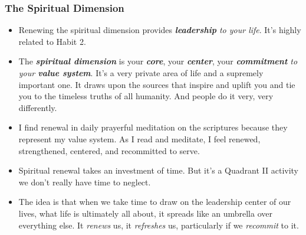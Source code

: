 \documentclass[11pt]{article}
\begin{document}
\subsubsection{The Spiritual Dimension}
\begin{itemize}
\item Renewing the spiritual dimension provides \emph{\textbf{leadership} to your life}. It's highly related to Habit 2.

\item The \emph{\textbf{spiritual dimension}} is your \emph{\textbf{core}}, your \emph{\textbf{center}}, your \emph{\textbf{commitment} to your \textbf{value system}}. It's a very private area of life and a supremely important one. It draws upon the sources that inspire and uplift you and tie you to the timeless truths of all humanity. And people do it very, very differently.

\item I find renewal in daily prayerful meditation on the scriptures because they represent my value system. As I read and meditate, I feel renewed, strengthened, centered, and recommitted to serve.

\item Spiritual renewal takes an investment of time. But it's a Quadrant II activity we don't really have time to neglect.

\item The idea is that when we take time to draw on the leadership center of our lives, what life is ultimately all about, it spreads like an umbrella over everything else. It \emph{renews} us, it \emph{refreshes} us, particularly if we \emph{recommit} to it.
\end{itemize}
\end{document}
